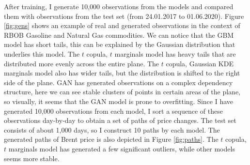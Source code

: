 \documentclass{article}
\begin{document}
After training, I generate 10,000 observations from the models and compared them with observations from the test set (from 24.01.2017 to 01.06.2020). Figure \ref{fig:gens} shows an example of real and generated observations in the context of RBOB Gasoline and Natural Gas commodities. We can notice that the GBM model has short tails, this can be explained by the Gaussian distribution that underlies this model. The $t$ copula, $t$ marginals model has heavy tails that are distributed more evenly across the entire plane. The $t$ copula, Gaussian KDE marginals model also has wider tails, but the distribution is shifted to the right side of the plane. GAN has generated observations on a complex dependency structure, here we can see stable clusters of points in certain areas of the plane, so visually, it seems that the GAN model is prone to overfitting. Since I have generated 10,000 observations from each model, I sort a sequence of these observations day-by-day to obtain a set of paths of price changes. The test set consists of about 1,000 days, so I construct 10 paths by each model. The generated paths of Brent price is also depicted in Figure \ref{fig:paths}. The $t$ copula, $t$ marginals model has generated a few significant outliers, while other models seems more stable.
\end{document}
